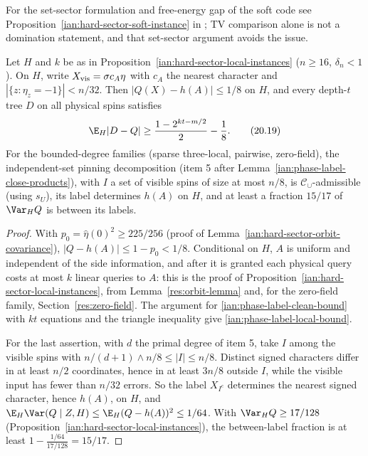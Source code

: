For the set-sector formulation and free-energy gap of the soft code see
Proposition~\ref{ian:hard-sector-soft-instance} in
; TV comparison alone is not a
domination statement, and that set-sector argument avoids the issue.

\begin{proposition}
\label{ian:phase-label-local-instance}
Let \(H\) and \(k\) be as in Proposition~\ref{ian:hard-sector-local-instances}
(\(n\ge16\), \(\delta_n<1\)). On \(H\), write
\(X_{\rm vis}=\sigma c_A\eta\) with \(c_A\) the nearest character and
\(|\{z:\eta_z=-1\}|<n/32\). Then \(|Q(X)-h(A)|\le1/8\) on \(H\), and
every depth-\(t\) tree \(D\) on all physical spins satisfies
\[
 \E_H|D-Q|
 \ge\frac{1-2^{kt-m/2}}2-\frac18.
 \tag{20.19}\label{ian:phase-label-local-bound}
\]
For the bounded-degree families (sparse three-local, pairwise,
zero-field), the independent-set pinning decomposition (item 5 after
Lemma~\ref{ian:phase-label-close-products}), with \(I\) a set of
visible spins of size at most \(n/8\), is \(\mathcal C_\cup\)-admissible
(using \(s_U\)), its label determines \(h(A)\) on \(H\), and at
least a fraction \(15/17\) of \(\Var_HQ\) is between its labels.
\end{proposition}

\begin{proof}
With \(p_0=\widehat\eta(0)^2\ge225/256\) (proof of
Lemma~\ref{ian:hard-sector-orbit-covariance}),
\(|Q-h(A)|\le1-p_0<1/8\). Conditional on \(H\), \(A\) is uniform and
independent of the side information, and after it is granted each
physical query costs at most \(k\) linear queries to \(A\): this is the
proof of Proposition~\ref{ian:hard-sector-local-instances}, from
Lemma~\ref{res:orbit-lemma} and, for the zero-field family,
Section~\ref{res:zero-field}. The argument for
\eqref{ian:phase-label-clean-bound} with \(kt\) equations and the
triangle inequality give \eqref{ian:phase-label-local-bound}.

For the last assertion, with \(d\) the primal degree of item 5, take
\(I\) among the visible spins with \(n/(d+1)\wedge n/8\le|I|\le n/8\).
Distinct signed characters differ in at least \(n/2\) coordinates, hence
in at least \(3n/8\) outside \(I\), while the visible input has fewer
than \(n/32\) errors. So the label \(X_{I^c}\) determines the nearest
signed character, hence \(h(A)\), on \(H\), and
\(\E_H\Var(Q\mid Z,H)\le\E_H(Q-h(A))^2\le1/64\). With
\(\Var_HQ\ge17/128\) (Proposition~\ref{ian:hard-sector-local-instances}),
the between-label fraction is at least \(1-\frac{1/64}{17/128}=15/17\).
\end{proof}

